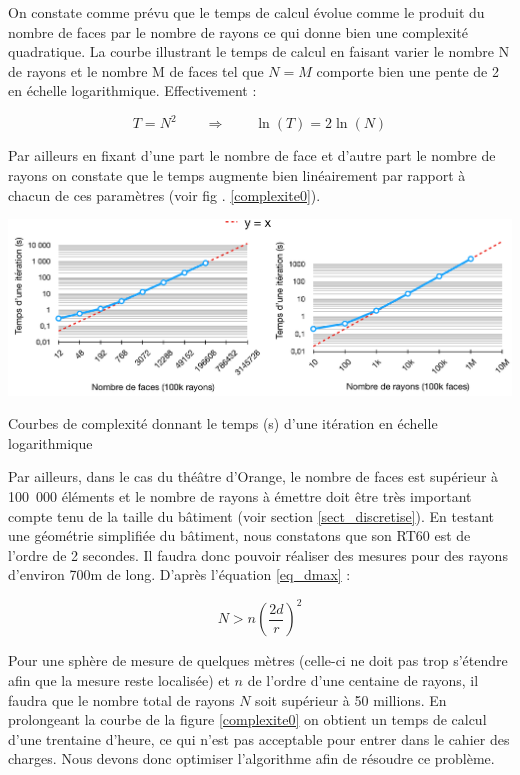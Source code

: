 On constate comme prévu que le temps de calcul évolue comme le produit du nombre de faces par le nombre de rayons ce qui donne bien une complexité quadratique. La courbe \label{complexite00} illustrant le temps de calcul en faisant varier le nombre N de rayons et le nombre M de faces tel que $N=M$ comporte bien une pente de 2 en échelle logarithmique. Effectivement :

\begin{equation}
T = N^2 \qquad \Rightarrow \qquad \ln{(T)} = 2 \ln{(N)}
\end{equation}

 Par ailleurs en fixant d'une part le nombre de face et d'autre part le nombre de rayons on constate que le temps augmente bien linéairement par rapport à chacun de ces paramètres (voir fig . \ref{complexite0}).

 \begin{figureth}
	\includegraphics[width=\linewidth]{images/complexite0}
	\caption{Courbes de complexité donnant le temps (s) d'une itération en échelle logarithmique}
	\label{complexite0}
\end{figureth}


Par ailleurs, dans le cas du théâtre d'Orange, le nombre de faces est supérieur à 100~000 éléments et le nombre de rayons à émettre doit être très important compte tenu de la taille du bâtiment (voir section \ref{sect_discretise}). En testant une géométrie simplifiée du bâtiment, nous constatons que son \gls{RT60} est de l'ordre de 2 secondes. Il faudra donc pouvoir réaliser des mesures pour des rayons d'environ 700m de long. D'après l'équation \ref{eq_dmax} :

\begin{equation}
N > n(\frac{2d}{r})^2
\end{equation}

Pour une sphère de mesure de quelques mètres (celle-ci ne doit pas trop s'étendre afin que la mesure reste localisée) et $n$ de l'ordre d'une centaine de rayons, il faudra que le nombre total de rayons $N$ soit supérieur à 50 millions. En prolongeant la courbe de la figure \ref{complexite0} on obtient un temps de calcul d'une trentaine d'heure, ce qui n'est pas acceptable pour entrer dans le cahier des charges. Nous devons donc optimiser l'algorithme afin de résoudre ce problème.

